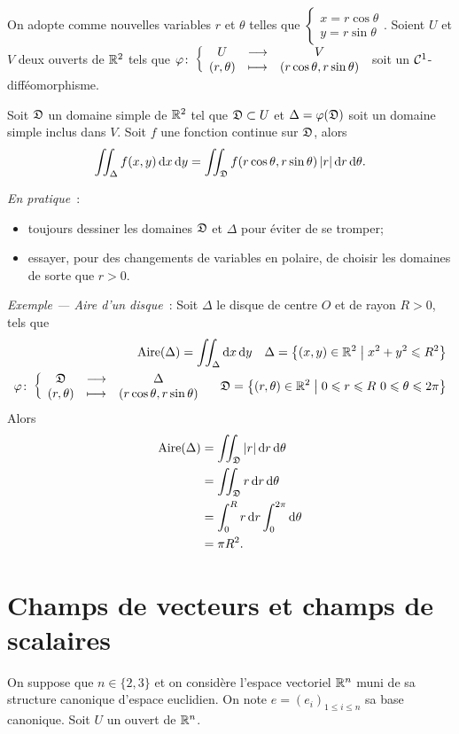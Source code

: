 \begin{theo}
  On adopte comme nouvelles variables \(r\) et \(\theta\) telles que
  \(\begin{cases} x=r\cos\theta \\ y=r\sin\theta \end{cases}\). Soient \(U\) et
    \(V\) deux ouverts de \(\mathbb{R}^2\) tels que \(\varphi\colon\left\{\begin{array}{ccc}U & \longrightarrow &V\\(r,
    \theta) & \longmapsto & (r\cos\theta, r\sin\theta)\end{array}\right.\) soit un
    \(\mathcal{C}^{1}\)-difféomorphisme.

    Soit \(\mathfrak{D}\) un domaine simple de \(\mathbb{R}^2\) tel que \(\mathfrak{D} \subset
    U\) et \(\Delta=\varphi(\mathfrak{D})\) soit un domaine simple inclus dans
    \(V\). Soit \(f\) une fonction continue sur \(\mathfrak{D}\), alors
    \begin{equation}
      \iint_\Delta f(x,y)\mathop{}\mathopen{}\mathrm{d} x \mathop{}\mathopen{}\mathrm{d} y = \iint_{\mathfrak{D}} f(r\cos\theta,
      r\sin\theta) \left\lvert r\right\rvert\mathop{}\mathopen{}\mathrm{d} r \mathop{}\mathopen{}\mathrm{d} \theta.
    \end{equation}
\end{theo}

\emph{En pratique}~:
\begin{itemize}
  \item toujours dessiner les domaines \(\mathfrak{D}\) et \(\Delta\) pour éviter
    de se tromper;
  \item essayer, pour des changements de variables en polaire, de choisir les
    domaines de sorte que \(r>0\).
\end{itemize}

\emph{Exemple --- Aire d'un disque}~: Soit \(\Delta\) le disque de centre \(O\)
et de rayon \(R>0\), tels que
\begin{align}
  \text{Aire}(\Delta) = \iint_\Delta \diff x \diff y \quad
  \Delta=\enstq{(x,y)\in\R^2}{x^2+y^2\leqslant R^2} \\
  \fonction{\varphi}{\Ddomaine}{\Delta}{(r, \theta)}{(r\cos\theta, r\sin\theta)}
  \quad \Ddomaine=\enstq{(r,\theta)\in\R^2}{0 \leqslant r \leqslant R \ 0
  \leqslant \theta \leqslant 2\pi}
\end{align}
Alors
\begin{align}
  \text{Aire}(\Delta) &= \iint_{\mathfrak{D}} \left\lvert r\right\rvert\mathop{}\mathopen{}\mathrm{d} r \mathop{}\mathopen{}\mathrm{d} \theta \\
  &= \iint_{\mathfrak{D}} r\mathop{}\mathopen{}\mathrm{d} r \mathop{}\mathopen{}\mathrm{d} \theta \\
  &=\int_0^R r\mathop{}\mathopen{}\mathrm{d} r \int_0^{2\pi}\mathop{}\mathopen{}\mathrm{d} \theta \\
  &=\pi R^2.
\end{align}

\section{Champs de vecteurs et champs de scalaires}\label{sec:champvec}
On suppose que \(n \in \{2, 3\}\) et on considère l'espace vectoriel \(\mathbb{R}^n\)
muni de sa structure canonique d'espace euclidien. On note \(e=(e_i)_{1
\leqslant i \leqslant n}\) sa base canonique. Soit \(U\) un ouvert de \(\mathbb{R}^n\).

